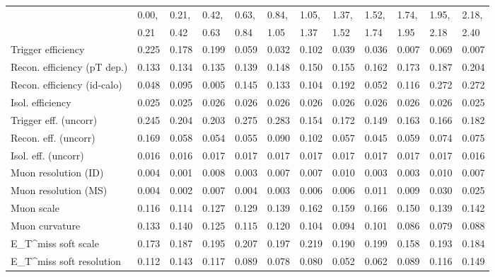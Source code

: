 \begin{tabular}{l|p{0.6cm}p{0.6cm}p{0.6cm}p{0.6cm}p{0.6cm}p{0.6cm}p{0.6cm}p{0.6cm}p{0.6cm}p{0.6cm}p{0.6cm}}
\hline
   & 0.00, & 0.21, & 0.42, & 0.63, & 0.84, & 1.05, & 1.37, & 1.52, & 1.74, & 1.95, & 2.18,  \\ 
   & 0.21 & 0.42 & 0.63 & 0.84 & 1.05 & 1.37 & 1.52 & 1.74 & 1.95 & 2.18 & 2.40  \\ 
\hline
Trigger efficiency                       & 0.225 & 0.178 & 0.199 & 0.059 & 0.032 & 0.102 & 0.039 & 0.036 & 0.007 & 0.069 & 0.007 \\
Recon. efficiency (pT dep.)              & 0.133 & 0.134 & 0.135 & 0.139 & 0.148 & 0.150 & 0.155 & 0.162 & 0.173 & 0.187 & 0.204 \\
Recon. efficiency (id-calo)              & 0.048 & 0.095 & 0.005 & 0.145 & 0.133 & 0.104 & 0.192 & 0.052 & 0.116 & 0.272 & 0.272 \\
Isol. efficiency                         & 0.025 & 0.025 & 0.026 & 0.026 & 0.026 & 0.026 & 0.026 & 0.026 & 0.026 & 0.026 & 0.025 \\
Trigger eff. (uncorr)                    & 0.245 & 0.204 & 0.203 & 0.275 & 0.283 & 0.154 & 0.172 & 0.149 & 0.163 & 0.166 & 0.182 \\
Recon. eff. (uncorr)                     & 0.169 & 0.058 & 0.054 & 0.055 & 0.090 & 0.102 & 0.057 & 0.045 & 0.059 & 0.074 & 0.075 \\
Isol. eff. (uncorr)                      & 0.016 & 0.016 & 0.017 & 0.017 & 0.017 & 0.017 & 0.017 & 0.017 & 0.017 & 0.017 & 0.016 \\
Muon resolution (ID)                     & 0.004 & 0.001 & 0.008 & 0.003 & 0.007 & 0.007 & 0.010 & 0.003 & 0.003 & 0.010 & 0.007 \\
Muon resolution (MS)                     & 0.004 & 0.002 & 0.007 & 0.004 & 0.003 & 0.006 & 0.006 & 0.011 & 0.009 & 0.030 & 0.025 \\
Muon scale                               & 0.116 & 0.114 & 0.127 & 0.129 & 0.139 & 0.162 & 0.159 & 0.166 & 0.150 & 0.139 & 0.142 \\
Muon curvature                           & 0.133 & 0.140 & 0.125 & 0.115 & 0.120 & 0.104 & 0.094 & 0.101 & 0.086 & 0.079 & 0.088 \\
E_{T}^{miss} soft scale                  & 0.173 & 0.187 & 0.195 & 0.207 & 0.197 & 0.219 & 0.190 & 0.199 & 0.158 & 0.193 & 0.184 \\
E_{T}^{miss} soft resolution             & 0.112 & 0.143 & 0.117 & 0.089 & 0.078 & 0.080 & 0.052 & 0.062 & 0.089 & 0.116 & 0.149 \\

\end{tabular}
